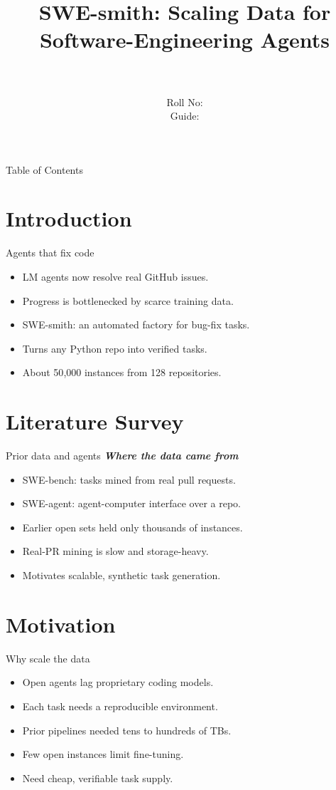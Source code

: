 \documentclass{beamer}
\title[\seminarShortTitle]{SWE-smith: Scaling Data for Software-Engineering Agents}
\author[\seminarName\ (\seminarShortCollege)]{\seminarName \\ \seminarRoll \\ Roll No: \seminarClassRoll \\ Guide: \seminarGuide}
\institute[\seminarShortCollege]{\seminarDept \\ \seminarCollege}
\date{\seminarDate}
\begin{document}
\begin{frame}\titlepage\end{frame}
\begin{frame}{Table of Contents}\tableofcontents\end{frame}
\section{Introduction}
\begin{frame}{Agents that fix code}
\begin{itemize}
\item LM agents now resolve real GitHub issues.
\item Progress is bottlenecked by scarce training data.
\item SWE-smith: an automated factory for bug-fix tasks.
\item Turns any Python repo into verified tasks.
\item About 50{,}000 instances from 128 repositories.
\end{itemize}
\end{frame}

\section{Literature Survey}
\begin{frame}{Prior data and agents}
\textbf{\textit{Where the data came from}}
\begin{itemize}
\item SWE-bench: tasks mined from real pull requests.
\item SWE-agent: agent-computer interface over a repo.
\item Earlier open sets held only thousands of instances.
\item Real-PR mining is slow and storage-heavy.
\item Motivates scalable, synthetic task generation.
\end{itemize}
\end{frame}

\section{Motivation}
\begin{frame}{Why scale the data}
\begin{itemize}
\item Open agents lag proprietary coding models.
\item Each task needs a reproducible environment.
\item Prior pipelines needed tens to hundreds of TBs.
\item Few open instances limit fine-tuning.
\item Need cheap, verifiable task supply.
\end{itemize}
\end{frame}
\end{document}
